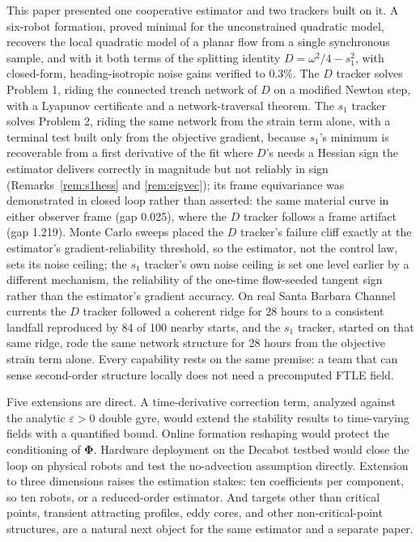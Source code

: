 \documentclass[lettersize,journal]{IEEEtran}
\begin{document}
This paper presented one cooperative estimator and two trackers built
on it. A six-robot formation, proved minimal for the unconstrained
quadratic model, recovers the local
quadratic model of a planar flow from a single synchronous sample, and
with it both terms of the splitting identity $D = \omega^2/4 - s_1^2$,
with closed-form, heading-isotropic noise gains verified to $0.3\%$.
The $D$ tracker solves Problem 1, riding the connected trench network of
$D$ on a modified Newton step, with a Lyapunov certificate and a
network-traversal theorem. The $s_1$
tracker solves Problem 2, riding the same network from the strain term
alone, with a terminal test built only from the objective gradient,
because $s_1$'s minimum is recoverable from a first derivative of the
fit where $D$'s needs a Hessian sign the estimator delivers correctly
in magnitude but not reliably in sign (Remarks~\ref{rem:s1hess} and
\ref{rem:eigvec}); its frame
equivariance was demonstrated in closed loop rather than asserted: the
same material curve in either observer frame (gap 0.025), where the $D$
tracker follows a frame artifact (gap 1.219). Monte Carlo sweeps placed
the $D$ tracker's failure cliff exactly at the estimator's
gradient-reliability threshold, so the estimator, not the control law,
sets its noise ceiling; the $s_1$ tracker's own noise ceiling is set
one level earlier by a different mechanism, the reliability of the
one-time flow-seeded tangent sign rather than the estimator's gradient
accuracy. On
real Santa Barbara Channel currents the $D$ tracker followed a coherent
ridge for 28 hours to a consistent landfall reproduced by 84 of 100
nearby starts, and the $s_1$ tracker, started on that same ridge, rode
the same network structure for 28 hours from the objective strain term
alone. Every capability rests on the same premise: a team that can
sense second-order structure locally does not need a precomputed FTLE
field.

Five extensions are direct. A time-derivative correction term,
analyzed against the analytic $\varepsilon > 0$ double gyre, would
extend the stability results to time-varying fields with a quantified
bound. Online formation reshaping would protect the conditioning of
$\boldsymbol{\Phi}$. Hardware deployment on the Decabot testbed would
close the loop on physical robots and test the no-advection assumption
directly. Extension to three dimensions raises the estimation stakes:
ten coefficients per component, so ten robots, or a reduced-order
estimator. And targets other than critical points, transient attracting
profiles, eddy cores, and other non-critical-point structures, are a
natural next object for the same estimator and a separate paper.
\end{document}
